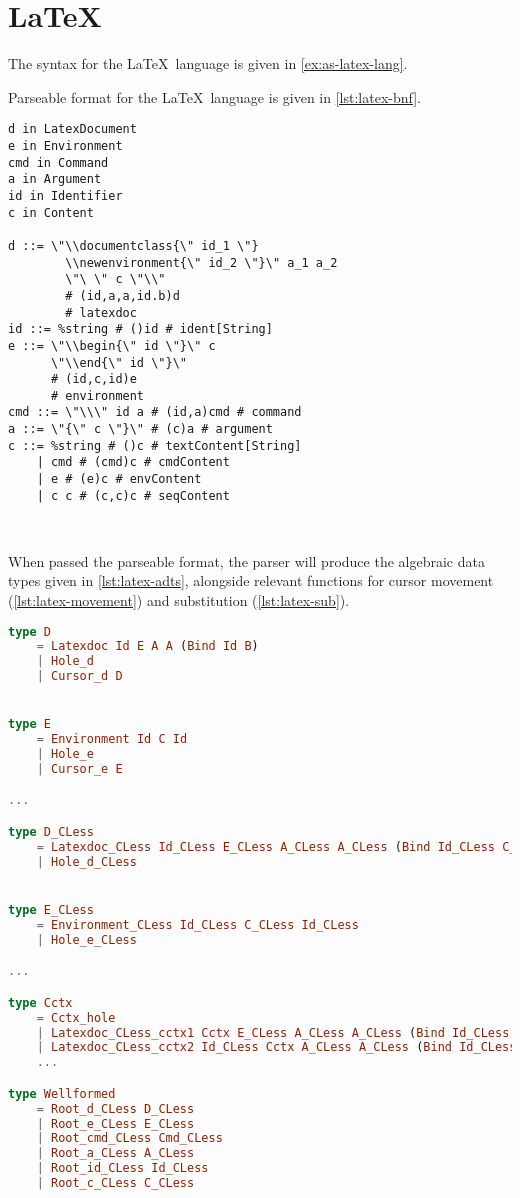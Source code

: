 \section{\LaTeX}

The syntax for the \LaTeX \ language is given in \cref{ex:as-latex-lang}.

Parseable format for the \LaTeX \ language is given in \cref{lst:latex-bnf}.

\begin{lstlisting}[style=inline, caption={Parseable format of \LaTeX \ language syntax}, label={lst:latex-bnf}]
d in LatexDocument
e in Environment
cmd in Command
a in Argument
id in Identifier
c in Content

d ::= \"\\documentclass{\" id_1 \"}
        \\newenvironment{\" id_2 \"}\" a_1 a_2 
        \"\ \" c \"\\" 
        # (id,a,a,id.b)d 
        # latexdoc
id ::= %string # ()id # ident[String]
e ::= \"\\begin{\" id \"}\" c 
      \"\\end{\" id \"}\" 
      # (id,c,id)e 
      # environment
cmd ::= \"\\\" id a # (id,a)cmd # command
a ::= \"{\" c \"}\" # (c)a # argument
c ::= %string # ()c # textContent[String] 
    | cmd # (cmd)c # cmdContent 
    | e # (e)c # envContent 
    | c c # (c,c)c # seqContent
    
    
\end{lstlisting}

When passed the parseable format, the parser will produce the algebraic data types
given in \cref{lst:latex-adts}, alongside relevant functions for cursor movement (\cref{lst:latex-movement})
and substitution (\cref{lst:latex-sub}).

\begin{lstlisting}[style=inline, language=elm, caption={Generated ADT for the \LaTeX \ language}, label={lst:latex-adts}]
type D
    = Latexdoc Id E A A (Bind Id B)
    | Hole_d
    | Cursor_d D


type E
    = Environment Id C Id
    | Hole_e
    | Cursor_e E

...

type D_CLess
    = Latexdoc_CLess Id_CLess E_CLess A_CLess A_CLess (Bind Id_CLess C_CLess)
    | Hole_d_CLess


type E_CLess
    = Environment_CLess Id_CLess C_CLess Id_CLess
    | Hole_e_CLess

...

type Cctx
    = Cctx_hole
    | Latexdoc_CLess_cctx1 Cctx E_CLess A_CLess A_CLess (Bind Id_CLess B_CLess)
    | Latexdoc_CLess_cctx2 Id_CLess Cctx A_CLess A_CLess (Bind Id_CLess B_CLess)
    ...

type Wellformed
    = Root_d_CLess D_CLess
    | Root_e_CLess E_CLess
    | Root_cmd_CLess Cmd_CLess
    | Root_a_CLess A_CLess
    | Root_id_CLess Id_CLess
    | Root_c_CLess C_CLess

\end{lstlisting}


